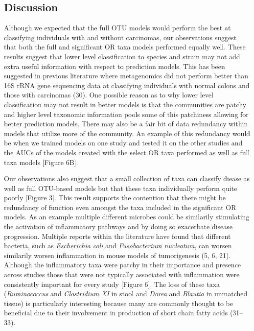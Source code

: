 \documentclass[12pt,]{article}
\begin{document}
\newpage

\subsection{Discussion}\label{discussion}

Although we expected that the full OTU models would perform the best at
classifying individuals with and without carcinomas, our observations
suggest that both the full and significant OR taxa models performed
equally well. These results suggest that lower level classification to
species and strain may not add extra useful information with respect to
prediction models. This has been suggested in previous literature where
metagenomics did not perform better than 16S rRNA gene sequencing data
at classifying individuals with normal colons and those with carcinomas
(30). One possible reason as to why lower level classification may not
result in better models is that the communities are patchy and higher
level taxonomic information pools some of this patchiness allowing for
better prediction models. There may also be a fair bit of data
redundancy within models that utilize more of the community. An example
of this redundancy would be when we trained models on one study and
tested it on the other studies and the AUCs of the models created with
the select OR taxa performed as well as full taxa models {[}Figure
6B{]}.

Our observations also suggest that a small collection of taxa can
classify diease as well as full OTU-based models but that these taxa
individually perform quite poorly {[}Figure 3{]}. This result supports
the contention that there might be redundancy of function even amongst
the taxa included in the significant OR models. As an example multiple
different microbes could be similarily stimulating the activation of
inflammatory pathways and by doing so exacerbate disease progression.
Multiple reports within the literature have found that different
bacteria, such as \emph{Escherichia coli} and \emph{Fusobacterium
nucleatum}, can worsen similarily worsen inflammation in mouse models of
tumorigenesis (5, 6, 21). Although the inflammatory taxa were patchy in
their importance and presence across studies those that were not
typically associated with inflammation were consistently important for
every study {[}Figure 6{]}. The loss of these taxa (\emph{Ruminococcus}
and \emph{Clostridium XI} in stool and \emph{Dorea} and \emph{Blautia}
in unmatched tissue) is particularly interesting because many are
commonly thought to be beneficial due to their involvement in production
of short chain fatty acids (31--33).
\end{document}
